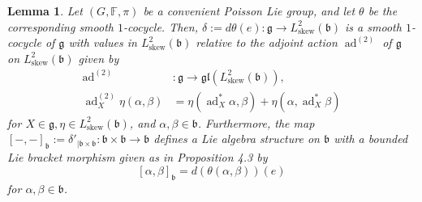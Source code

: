 \documentclass[11pt,reqno]{amsart}
\newtheorem{lemma}[theorem]{Lemma}
\theoremstyle{definition}
\numberwithin{equation}{section}
\begin{document}
\begin{lemma}\label{4.7}
Let $(G, \mathbb{F}, \pi)$ be a convenient Poisson Lie group, and let $\theta$ be the corresponding smooth $1$-cocycle. Then, $\delta := d\theta(e): \mathfrak{g} \rightarrow L^2_{\text{skew}}(\mathfrak{b})$ is a smooth $1$-cocycle of $\mathfrak{g}$ with values in $L^2_{\text{skew}}(\mathfrak{b})$ relative to the adjoint action $\operatorname{ad}^{(2)}$ of $\mathfrak{g}$ on $L^2_{\text{skew}}(\mathfrak{b})$ given by
\begin{align*}
\operatorname{ad}^{(2)}&: \mathfrak{g} \to \mathfrak{gl}(L^2_{\text{skew}}(\mathfrak{b})), \\
\operatorname{ad}^{(2)}_{X} \eta (\alpha, \beta) &= \eta(\operatorname{ad}^*_{X} \alpha, \beta) + \eta(\alpha, \operatorname{ad}^*_X \beta)
\end{align*}
for $X \in \mathfrak{g}, \eta \in L^2_{\text{skew}}(\mathfrak{b})$, and $\alpha, \beta \in \mathfrak{b}$. Furthermore, the map $[-,-]_{\mathfrak{b}} := \delta'_{\mid \mathfrak{b} \times \mathfrak{b}}: \mathfrak{b} \times \mathfrak{b} \rightarrow \mathfrak{b}$ defines a Lie algebra structure on $\mathfrak{b}$ with a bounded Lie bracket morphism given as in Proposition 4.3 by
\[
[\alpha, \beta]_{\mathfrak{b}} = d(\theta(\alpha, \beta))(e)
\]
for $\alpha, \beta \in \mathfrak{b}$.
\end{lemma}
\end{document}
